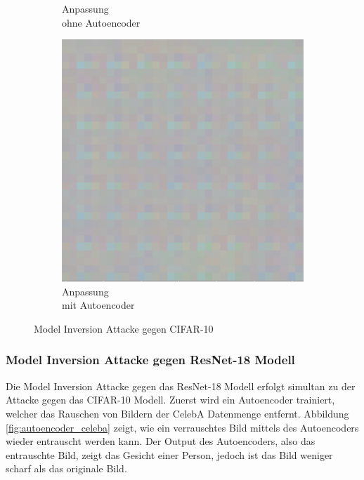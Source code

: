 \begin{figure}[!htb]
\begin{subfigure}[h]{0.3\textwidth}
  \caption{Anpassung \\ohne Autoencoder}
\end{subfigure}
\begin{subfigure}[h]{0.3\textwidth}
  \centering
  \includegraphics[width=\linewidth]{figures/autoencoder_cifar/mi_cifar_finish_grey.png}
  \caption{Anpassung \\mit Autoencoder}
\end{subfigure}
\caption{Model Inversion Attacke gegen CIFAR-10}
\label{fig:moder_inv_c10}
\end{figure}

\subsubsection*{Model Inversion Attacke gegen ResNet-18 Modell}

Die Model Inversion Attacke gegen das ResNet-18 Modell erfolgt simultan zu der Attacke gegen das CIFAR-10 Modell.
Zuerst wird ein Autoencoder trainiert, welcher das Rauschen von Bildern der CelebA Datenmenge entfernt.
Abbildung \ref{fig:autoencoder_celeba} zeigt, wie ein verrauschtes Bild mittels des Autoencoders wieder entrauscht werden kann.
Der Output des Autoencoders, also das entrauschte Bild, zeigt das Gesicht einer Person, jedoch ist das Bild weniger scharf als das originale Bild.

